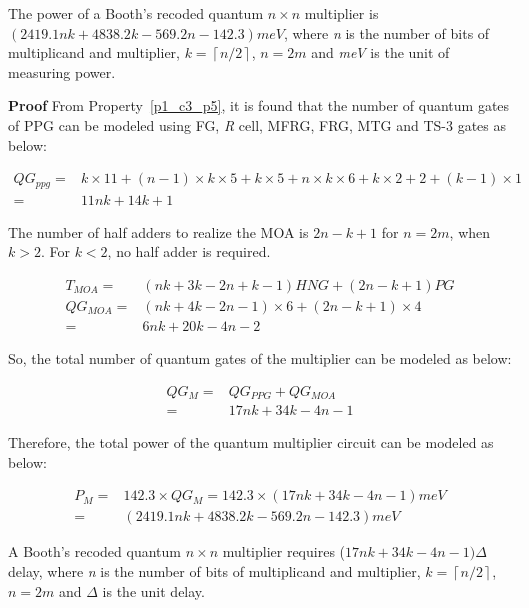 \begin{property}\textnormal{
	The power of a Booth's recoded quantum $n\times n$ multiplier is $(2419.1nk + 4838.2k - 569.2n - 142.3) meV$, where \textit{n} is the number of bits of multiplicand and multiplier, $k = \left\lceil n/2\right\rceil $, $n=2m$ and \textit{meV} is the unit of measuring power.}
\end{property}

\noindent\textbf{Proof}\textnormal{
From Property~\ref{p1_c3_p5}, it is found that the number of quantum gates of PPG can be modeled using FG, \textit{R} cell, MFRG, FRG, MTG and TS-3 gates as below:}


\begin{align*}
QG_{ppg} =& k\times 11 + (n-1) \times k\times 5 + k\times 5 + n\times k\times 6 + k\times 2 + 2 + (k-1)\times 1\\
=&11nk + 14k + 1	
\end{align*}

\noindent The number of half adders to realize the MOA is $2n-k+1$ for $n=2m$, when $k>2$. For $k<2$, no half adder is required. 

\begin{align*}
T_{MOA}=& (nk + 3k - 2n + k - 1)HNG + (2n - k + 1) PG\\	
QG_{MOA}=& (nk + 4k - 2n - 1)\times 6+(2n - k + 1)\times 4\\	
=& 6nk + 20k - 4n - 2	
\end{align*}

\noindent So, the total number of quantum gates of the multiplier can be modeled as below:

\begin{align*}
	QG_{M}=& QG_{PPG}+ QG_{MOA}\\
	=& 17nk + 34k - 4n - 1
\end{align*}

\noindent Therefore, the total power of the quantum multiplier circuit can be modeled as below:

\begin{align*}
P_{M} =&142.3 \times QG_{M} =142.3 \times  (17nk + 34k - 4n - 1)meV\\
=& (2419.1nk + 4838.2k - 569.2n - 142.3) meV
\end{align*}


\begin{property}\textnormal{
A Booth's recoded quantum $n\times n$ multiplier requires ($17nk + 34k - 4n - 1) \Delta$ delay, where \textit{n} is the number of bits of multiplicand and multiplier, $k = \left\lceil n/2\right\rceil $, $n=2m$ and $\Delta$ is the unit delay.	}
\end{property}


